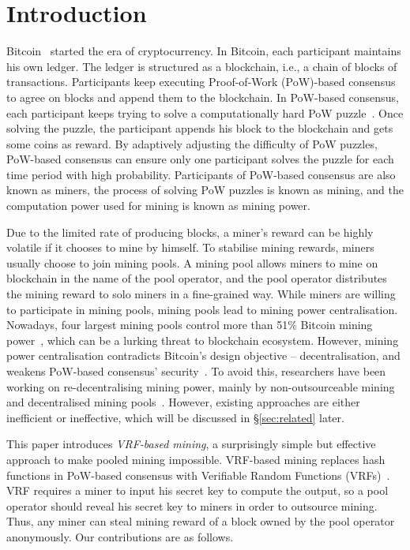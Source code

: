 \section{Introduction}
\label{sec:intro}

Bitcoin~\cite{nakamoto2008bitcoin} started the era of cryptocurrency.
In Bitcoin, each participant maintains his own ledger.
The ledger is structured as a blockchain, i.e., a chain of blocks of transactions.
Participants keep executing Proof-of-Work (PoW)-based consensus to agree on blocks and append them to the blockchain.
In PoW-based consensus, each participant keeps trying to solve a computationally hard PoW puzzle~\cite{dwork1992pricing}.
Once solving the puzzle, the participant appends his block to the blockchain and gets some coins as reward.
By adaptively adjusting the difficulty of PoW puzzles, PoW-based consensus can ensure only one participant solves the puzzle for each time period with high probability.
Participants of PoW-based consensus are also known as miners, the process of solving PoW puzzles is known as mining, and the computation power used for mining is known as mining power.

Due to the limited rate of producing blocks, a miner's reward can be highly volatile if it chooses to mine by himself.
To stabilise mining rewards, miners usually choose to join mining pools.
A mining pool allows miners to mine on blockchain in the name of the pool operator, and the pool operator distributes the mining reward to solo miners in a fine-grained way.
While miners are willing to participate in mining pools, mining pools lead to mining power centralisation.
Nowadays, four largest mining pools control more than 51\% Bitcoin mining power~\cite{btc-com}, which can be a lurking threat to blockchain ecosystem.
However, mining power centralisation contradicts Bitcoin's design objective -- decentralisation, and weakens PoW-based consensus' security~\cite{nakamoto2008bitcoin, eyal2018majority}.
To avoid this, researchers have been working on re-decentralising mining power, mainly by non-outsourceable mining~\cite{miller2015nonoutsourceable,2P-PoW} and decentralised mining pools~\cite{voight2011p2pool, luu2017smartpool, draft-bip-BetterHash}.
However, existing approaches are either inefficient or ineffective, which will be discussed in \S\ref{sec:related} later.

This paper introduces \textit{VRF-based mining}, a surprisingly simple but effective approach to make pooled mining impossible.
VRF-based mining replaces hash functions in PoW-based consensus with Verifiable Random Functions (VRFs)~\cite{micali1999verifiable}.
VRF requires a miner to input his secret key to compute the output, so a pool operator should reveal his secret key to miners in order to outsource mining.
Thus, any miner can steal mining reward of a block owned by the pool operator anonymously.
Our contributions are as follows.

